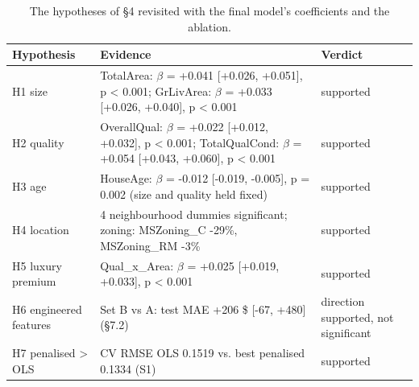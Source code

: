 \begin{table}[t]
\centering
\small
\begin{tabular}{lll}
\toprule
Hypothesis & Evidence & Verdict \\
\midrule
H1 size & TotalArea: $\beta$ = +0.041 [+0.026, +0.051], p < 0.001; GrLivArea: $\beta$ = +0.033 [+0.026, +0.040], p < 0.001 & supported \\
H2 quality & OverallQual: $\beta$ = +0.022 [+0.012, +0.032], p < 0.001; TotalQualCond: $\beta$ = +0.054 [+0.043, +0.060], p < 0.001 & supported \\
H3 age & HouseAge: $\beta$ = -0.012 [-0.019, -0.005], p = 0.002 (size and quality held fixed) & supported \\
H4 location & 4 neighbourhood dummies significant; zoning: MSZoning\_C -29\%, MSZoning\_RM -3\% & supported \\
H5 luxury premium & Qual\_x\_Area: $\beta$ = +0.025 [+0.019, +0.033], p < 0.001 & supported \\
H6 engineered features & Set B vs A: test MAE +206 \$ [-67, +480] (§7.2) & direction supported, not significant \\
H7 penalised > OLS & CV RMSE OLS 0.1519 vs. best penalised 0.1334 (S1) & supported \\
\bottomrule
\end{tabular}
\caption{The hypotheses of §4 revisited with the final model's coefficients and the ablation.}
\label{tab:hypothesis_check}
\end{table}
